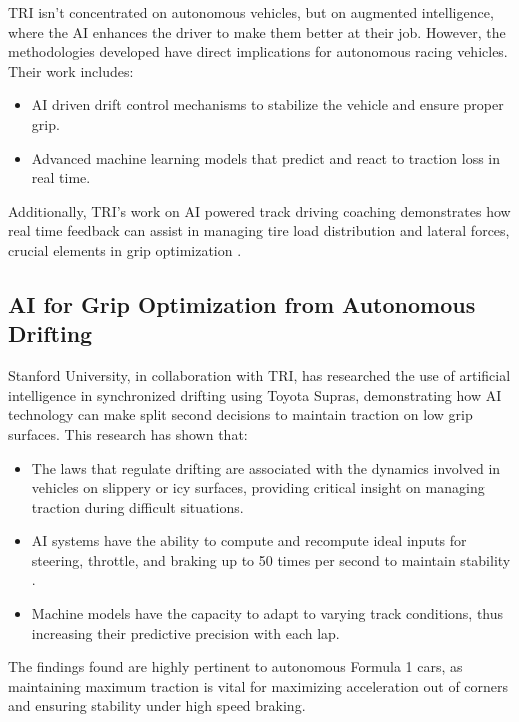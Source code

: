 \documentclass[a4paper,final,12pt]{report}
\begin{document}
TRI isn't concentrated on autonomous vehicles, but on augmented intelligence, where the AI enhances the driver to make them better at their job. However, the methodologies developed have direct implications for autonomous racing vehicles. Their work includes:
\begin{itemize}
    \item AI driven drift control mechanisms to stabilize the vehicle and ensure proper grip.
    \item Advanced machine learning models that predict and react to traction loss in real time.
\end{itemize}

Additionally, TRI’s work on AI powered track driving coaching demonstrates how real time feedback can assist in managing tire load distribution and lateral forces, crucial elements in grip optimization \cite{tri2023}. 

\subsection{AI for Grip Optimization from Autonomous Drifting}
Stanford University, in collaboration with TRI, has researched the use of artificial intelligence in synchronized drifting using Toyota Supras, demonstrating how AI technology can make split second decisions to maintain traction on low grip surfaces. This research has shown that:
\begin{itemize}
    \item The laws that regulate drifting are associated with the dynamics involved in vehicles on slippery or icy surfaces, providing critical insight on managing traction during difficult situations.
    \item AI systems have the ability to compute and recompute ideal inputs for steering, throttle, and braking up to 50 times per second to maintain stability \cite{verge2024}.
    \item Machine models have the capacity to adapt to varying track conditions, thus increasing their predictive precision with each lap.
\end{itemize}

The findings found are highly pertinent to autonomous Formula 1 cars, as maintaining maximum traction is vital for maximizing acceleration out of corners and ensuring stability under high speed braking.
\end{document}
